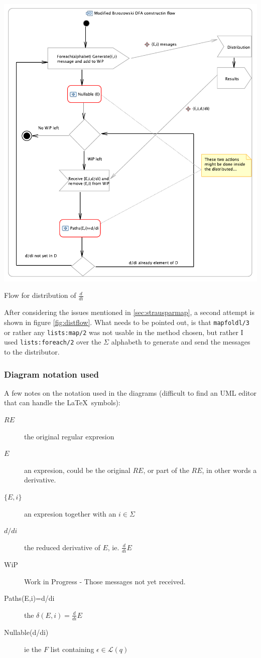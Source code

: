 \documentclass[a4paper,11pt]{report}
\begin{document}
\begin{Figure}[htbp] %
	 \centering
	 \includegraphics[scale=1]{Activity.pdf} 
	 \caption{Flow for distribution of $\frac{d}{di}$}
	 \label{fig:distflow}
\end{Figure}
After considering the issues mentioned in \ref{sec:strausparmap}, a
second attempt is shown in figure \ref{fig:distflow}. What needs to be
pointed out, is that \texttt{mapfoldl/3} or rather any
\texttt{lists:map/2} was not usable in the method chosen, but rather I
used \texttt{lists:foreach/2} over the $\Sigma$ alphabeth to generate
and send the messages to the distributor.


\subsubsection{Diagram notation used}
A few notes on the notation used in the diagrams (difficult to find an
UML editor that can handle the \LaTeX\ symbols):
\begin{description}
\item[$RE$] the original regular expresion
\item[$E$] an expresion, could be the original $RE$, or part of the $RE$, in other words a derivative.
\item[$\{E,i\}$] an expresion together with an $i\in\Sigma$
\item[$d/di$] the reduced derivative of $E$, ie. $\frac{d}{di}E$
\item[WiP] Work in Progress - Those messages not yet received.
\item[Paths(E,i)=d/di] the $\delta(E,i)= \frac{d}{di}E$
\item[Nullable(d/di)] ie the $F$ list containing $\epsilon\in\mathcal{L}(q)$
\end{description}
\end{document}
